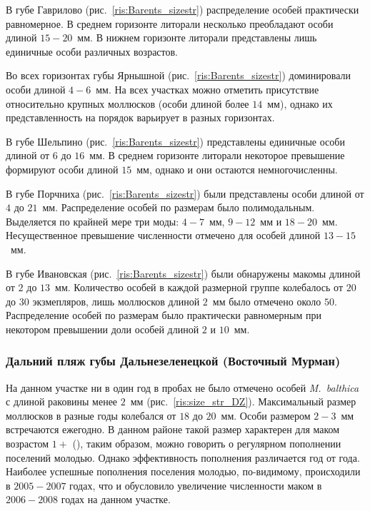 В губе Гаврилово (рис.~\ref{ris:Barents_sizestr}) распределение особей практически равномерное. 
В среднем горизонте литорали несколько преобладают особи длиной $15-20$~мм. 
В нижнем горизонте литорали представлены лишь единичные особи различных возрастов.	

Во всех горизонтах губы Ярнышной (рис.~\ref{ris:Barents_sizestr}) доминировали особи длиной $4-6$~мм. 
На всех участках можно отметить присутствие относительно крупных моллюсков (особи длиной более $14$~мм), однако их представленность на порядок варьирует в разных горизонтах.

В губе Шельпино (рис.~\ref{ris:Barents_sizestr})  представлены единичные особи длиной от $6$ до $16$~мм. 
В среднем горизонте литорали некоторое превышение формируют особи длиной $15$~мм, однако и они остаются немногочисленны.

В губе Порчниха (рис.~\ref{ris:Barents_sizestr}) были представлены особи длиной от $4$ до $21$~мм. 
Распределение особей по размерам было полимодальным. 
Выделяется по крайней мере три моды: $4-7$~мм, $9-12$~мм и $18-20$~мм. 
Несущественное превышение численности  отмечено для особей длиной $13-15$~мм.

В губе Ивановская (рис.~\ref{ris:Barents_sizestr}) были обнаружены макомы длиной от $2$ до $13$~мм. 
Количество особей в каждой размерной группе колебалось от $20$ до $30$ экзмепляров, лишь моллюсков длиной $2$~мм было отмечено около $50$. 
Распределение особей по размерам было практически равномерным при некотором превышении доли особей длиной $2$ и $10$~мм. 

		\subsubsection{Дальний пляж губы Дальнезеленецкой (Восточный Мурман)}
На данном участке ни в один год в пробах не было отмечено особей {\it M.~balthica} с длиной раковины менее $2$~мм (рис.~\ref{ris:size_str_DZ}). 
Максимальный размер моллюсков в разные годы колебался от $18$ до $20$~мм. 
Особи размером $2-3$~мм встречаются ежегодно. 
В данном районе такой размер характерен для маком возрастом $1+$ (\cite{Nazarova_et_al_2010}), таким образом, можно говорить о регулярном пополнении поселений молодью. 
Однако эффективность пополнения различается год от года. 
Наиболее успешные пополнения поселения молодью, по-видимому, происходили в $2005-2007$ годах, что и обусловило увеличение численности маком в $2006-2008$ годах на данном участке.

\bigskip

